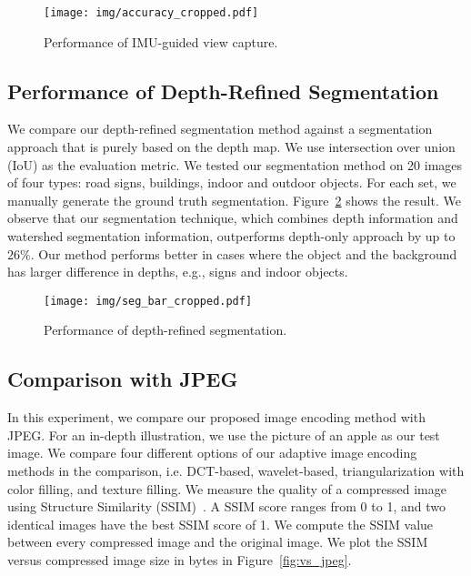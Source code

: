 \begin{figure}[!htb]
	\begin{center}
		\texttt{[image: img/accuracy\_cropped.pdf]}
		\caption{Performance of IMU-guided view capture.}
		\label{fig:accuracy_bar}
	\end{center}
\end{figure}


\subsection{Performance of Depth-Refined Segmentation}

We compare our depth-refined segmentation method against a segmentation approach that is purely based on the depth map. We use intersection over union (IoU) as the evaluation metric. We tested our segmentation method on 20 images of four types: road signs, buildings, indoor and outdoor objects. For each set, we manually generate the ground truth segmentation. Figure~\ref{fig:seg_bar} shows the result. We observe that our segmentation technique, which combines depth information and watershed segmentation information, outperforms depth-only approach by up to $26\%$. Our method performs better in cases where the object and the background has larger difference in depths, e.g., signs and indoor objects.

\begin{figure}[!htb]
	\begin{center}
		\texttt{[image: img/seg\_bar\_cropped.pdf]}
		\caption{Performance of depth-refined segmentation.}
		\label{fig:seg_bar}
	\end{center}
\end{figure}


\subsection{Comparison with JPEG}


In this experiment, we compare our proposed image encoding method with JPEG. For an in-depth illustration, we use the picture of an apple as our test image. We compare four different options of our adaptive image encoding methods in the comparison, i.e. DCT-based, wavelet-based, triangularization with color filling, and texture filling. We measure the quality of a compressed image using Structure Similarity (SSIM)~\cite{wang2004image}. A SSIM score ranges from 0 to 1, and two identical images have the best SSIM score of 1. We compute the SSIM value between every compressed image and the original image. We plot the SSIM versus compressed image size in bytes in Figure~\ref{fig:vs_jpeg}.


